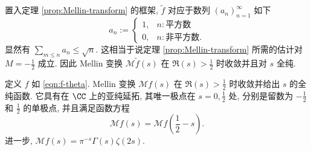 置入定理 \ref{prop:Mellin-transform} 的框架, $\tilde{f}$ 对应于数列 $(a_n)_{n=1}^\infty$ 如下
\[ a_n := \begin{cases}
	1, & n: \text{平方数} \\
	0, & n: \text{非平方数}.
\end{cases} \]
显然有 $\sum_{m \leq n} a_n \leq \sqrt{n}$. 这相当于说定理 \ref{prop:Mellin-transform} 所需的估计对 $M = -\frac{1}{2}$ 成立. 因此 Mellin 变换 $\mathcal{M}\tilde{f}(s)$ 在 $\Re(s) > \frac{1}{2}$ 时收敛并且对 $s$ 全纯.

\begin{theorem}[B.\ Riemann]\label{prop:zeta-fcn-Mellin}
	定义 $f$ 如 \eqref{eqn:f-theta}. Mellin 变换 $\mathcal{M}f(s)$ 在 $\Re(s) > \frac{1}{2}$ 时收敛并给出 $s$ 的全纯函数. 它具有在 $\CC$ 上的亚纯延拓, 其唯一极点在 $s=0, \frac{1}{2}$ 处, 分别是留数为 $-\frac{1}{2}$ 和 $\frac{1}{2}$ 的单极点, 并且满足函数方程
	\[ \mathcal{M}f(s) = \mathcal{M}f\left( \frac{1}{2} - s \right). \]
	进一步, $\mathcal{M}f(s) = \pi^{-s} \Gamma(s) \zeta(2s)$.
\end{theorem}

